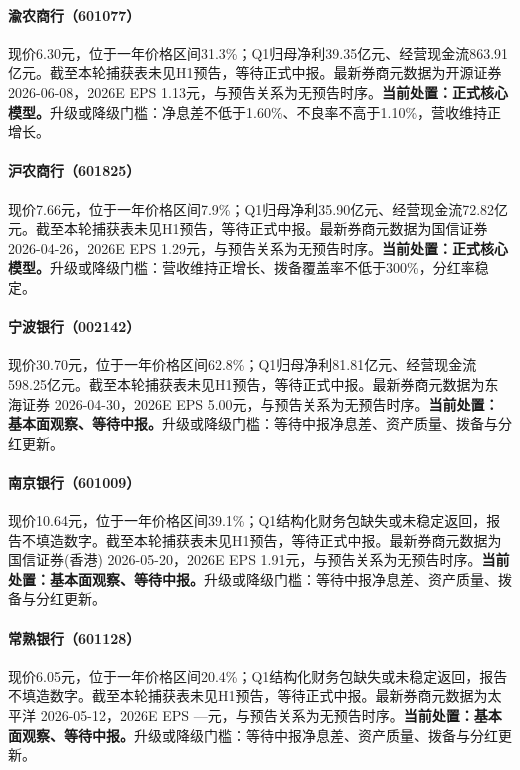 \paragraph{渝农商行（601077）}
现价6.30元，位于一年价格区间31.3\%；Q1归母净利39.35亿元、经营现金流863.91亿元。截至本轮捕获表未见H1预告，等待正式中报。最新券商元数据为开源证券 2026-06-08，2026E EPS 1.13元，与预告关系为无预告时序。\textbf{当前处置：正式核心模型。}升级或降级门槛：净息差不低于1.60\%、不良率不高于1.10\%，营收维持正增长。

\paragraph{沪农商行（601825）}
现价7.66元，位于一年价格区间7.9\%；Q1归母净利35.90亿元、经营现金流72.82亿元。截至本轮捕获表未见H1预告，等待正式中报。最新券商元数据为国信证券 2026-04-26，2026E EPS 1.29元，与预告关系为无预告时序。\textbf{当前处置：正式核心模型。}升级或降级门槛：营收维持正增长、拨备覆盖率不低于300\%，分红率稳定。

\paragraph{宁波银行（002142）}
现价30.70元，位于一年价格区间62.8\%；Q1归母净利81.81亿元、经营现金流598.25亿元。截至本轮捕获表未见H1预告，等待正式中报。最新券商元数据为东海证券 2026-04-30，2026E EPS 5.00元，与预告关系为无预告时序。\textbf{当前处置：基本面观察、等待中报。}升级或降级门槛：等待中报净息差、资产质量、拨备与分红更新。

\paragraph{南京银行（601009）}
现价10.64元，位于一年价格区间39.1\%；Q1结构化财务包缺失或未稳定返回，报告不填造数字。截至本轮捕获表未见H1预告，等待正式中报。最新券商元数据为国信证券(香港) 2026-05-20，2026E EPS 1.91元，与预告关系为无预告时序。\textbf{当前处置：基本面观察、等待中报。}升级或降级门槛：等待中报净息差、资产质量、拨备与分红更新。

\paragraph{常熟银行（601128）}
现价6.05元，位于一年价格区间20.4\%；Q1结构化财务包缺失或未稳定返回，报告不填造数字。截至本轮捕获表未见H1预告，等待正式中报。最新券商元数据为太平洋 2026-05-12，2026E EPS ---元，与预告关系为无预告时序。\textbf{当前处置：基本面观察、等待中报。}升级或降级门槛：等待中报净息差、资产质量、拨备与分红更新。

